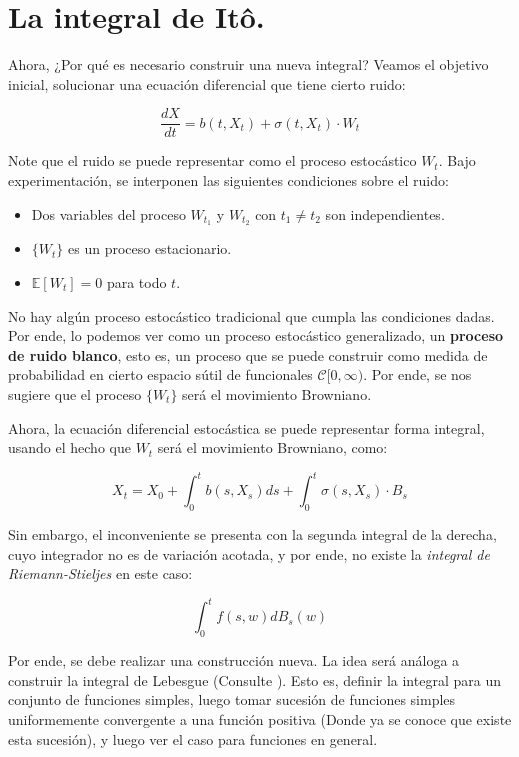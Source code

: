 \section{La integral de Itô.}

Ahora, ¿Por qué es necesario construir una nueva integral? Veamos el objetivo inicial, solucionar una ecuación diferencial que tiene cierto ruido:

\[
	\frac{dX}{dt} = b(t, X_t) + \sigma (t, X_t) \cdot W_t
\]

Note que el ruido se puede representar como el proceso estocástico $W_t$. Bajo experimentación, se interponen las siguientes condiciones sobre el ruido:

\begin{itemize}
	\item Dos variables del proceso $W_{t_1}$ y $W_{t_2}$ con $t_1 \neq t_2$ son independientes.
	\item $\{ W_t \}$ es un proceso estacionario.
	\item $\mathbb{E}[W_t] = 0$ para todo $t$.
\end{itemize} 

No hay algún proceso estocástico tradicional que cumpla las condiciones dadas. Por ende, lo podemos ver como un proceso estocástico generalizado, un \textbf{proceso de ruido blanco}, esto es, un proceso que se puede construir como medida de probabilidad en cierto espacio sútil de funcionales $\mathcal{C}[ 0, \infty )$. Por ende, se nos sugiere que el proceso $\{W_t\}$ será el movimiento Browniano. 

Ahora, la ecuación diferencial estocástica se puede representar forma integral, usando el hecho que $W_t$ será el movimiento Browniano, como:

\[
	X_t = X_0 + \int_0^t b(s, X_s) ds + \int_0^t  \sigma (s, X_s) \cdot B_s
\]

Sin embargo, el inconveniente se presenta con la segunda integral de la derecha, cuyo integrador no es de variación acotada, y por ende, no existe la \textit{integral de Riemann-Stieljes } en este caso:


\[
	\int_0^t f(s,w) dB_s(w)
\]

Por ende, se debe realizar una construcción nueva. La idea será análoga a construir la integral de Lebesgue (Consulte \cite{Measure_Theory_DC}). Esto es, definir la integral para un conjunto de funciones simples, luego tomar sucesión de funciones simples uniformemente convergente a una función positiva (Donde ya se conoce que existe esta sucesión), y luego ver el caso para funciones en general.\\

